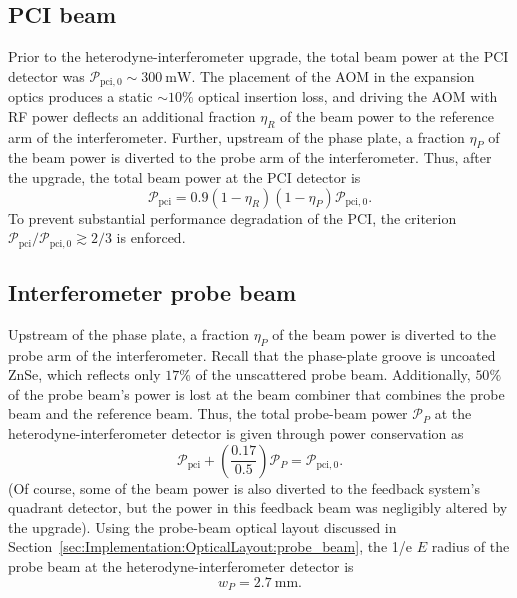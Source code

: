 \subsection{PCI beam}
\label{sec:Implementation:PowerDistribution:pci_beam}
Prior to the heterodyne-interferometer upgrade,
the total beam power at the PCI detector was
$\mathcal{P}_{\text{pci},0} \sim \SI{300}{\milli\watt}$.
The placement of the AOM in the expansion optics
produces a static $\sim 10\%$ optical insertion loss, and
driving the AOM with RF power deflects an additional fraction $\eta_R$
of the beam power to the reference arm of the interferometer.
Further, upstream of the phase plate,
a fraction $\eta_P$ of the beam power is diverted
to the probe arm of the interferometer.
Thus, after the upgrade, the total beam power at the PCI detector is
\begin{equation}
  \mathcal{P}_{\text{pci}}
  =
  0.9
  (1 - \eta_R)
  (1 - \eta_P)
  \mathcal{P}_{\text{pci},0}.
\end{equation}
To prevent substantial performance degradation of the PCI, the criterion
$\mathcal{P}_{\text{pci}} / \mathcal{P}_{\text{pci},0} \gtrsim 2 / 3$
is enforced.


\subsection{Interferometer probe beam}
\label{sec:Implementation:PowerDistribution:interferometer_probe_beam}
Upstream of the phase plate,
a fraction $\eta_P$ of the beam power is diverted
to the probe arm of the interferometer.
Recall that the phase-plate groove is uncoated ZnSe, which
reflects only $17\%$ of the unscattered probe beam.
Additionally, $50\%$ of the probe beam's power is lost
at the beam combiner that combines the probe beam and the reference beam.
Thus, the total probe-beam power $\mathcal{P}_P$
at the heterodyne-interferometer detector
is given through power conservation as
\begin{equation}
  \mathcal{P}_{\text{pci}}
  +
  \left( \frac{0.17}{0.5} \right) \mathcal{P}_P
  =
  \mathcal{P}_{\text{pci},0}.
  \label{eq:Implementation:probe_beam_power_constraint}
\end{equation}
(Of course, some of the beam power is also diverted
to the feedback system's quadrant detector, but
the power in this feedback beam was negligibly altered by the upgrade).
Using the probe-beam optical layout discussed in
Section~\ref{sec:Implementation:OpticalLayout:probe_beam},
the 1/e $E$ radius of the probe beam
at the heterodyne-interferometer detector is
\begin{equation}
  w_P = \SI{2.7}{\milli\meter}.
  \label{eq:Implementation:probe_beam_radius_at_detector}
\end{equation}


